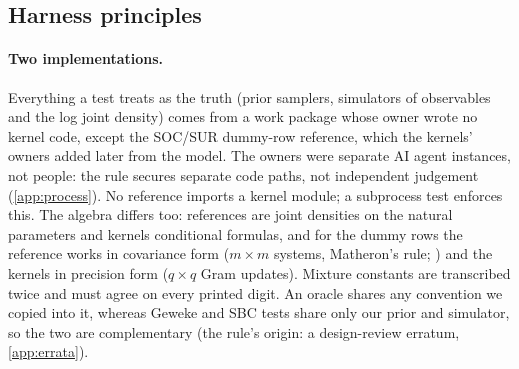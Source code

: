 \subsection{Harness principles}\label{sec:validation-harness}

\paragraph{Two implementations.} Everything a test treats as the truth (prior samplers, simulators
of observables and the log joint density) comes from a work package whose owner wrote no kernel
code, except the SOC/SUR dummy-row reference, which the kernels' owners added later from the
model. %
The owners were separate AI agent instances, not people: the rule secures separate code paths, not
independent judgement (\cref{app:process}). %
No reference imports a kernel module; a subprocess test enforces this. %
The algebra differs too: references are joint densities on the natural parameters and kernels
conditional formulas, and for the dummy rows the reference works in covariance form ($m\times m$
systems, Matheron's rule; \citealp{journel1978mining,chiles2012geostatistics,wilson2020efficiently})
and the kernels in precision form ($q\times q$ Gram updates). %
Mixture constants are transcribed twice and must agree on every printed digit. %
An oracle shares any convention we copied into it, whereas Geweke and SBC tests share only our
prior and simulator, so the two are complementary (the rule's origin: a design-review erratum,
\cref{app:errata}). %


